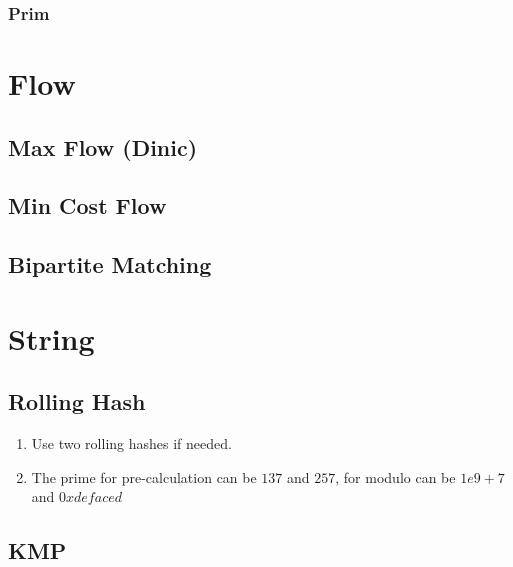 \documentclass[10pt,oneside]{article}
\begin{document}
\begin{landscape}
\begin{multicols}{2}
\subsubsection{Prim}


\section{Flow}

\subsection{Max Flow (Dinic)}


\subsection{Min Cost Flow}


\subsection{Bipartite Matching}



\section{String}

\subsection{Rolling Hash}

\begin{enumerate}
	\item Use two rolling hashes if needed.  
	\item The prime for pre-calculation can be $137$ and $257$, for modulo can be $1e9 + 7$ and $0xdefaced$ 
\end{enumerate}



\subsection{KMP}


\end{multicols}
\end{landscape}
\end{document}
